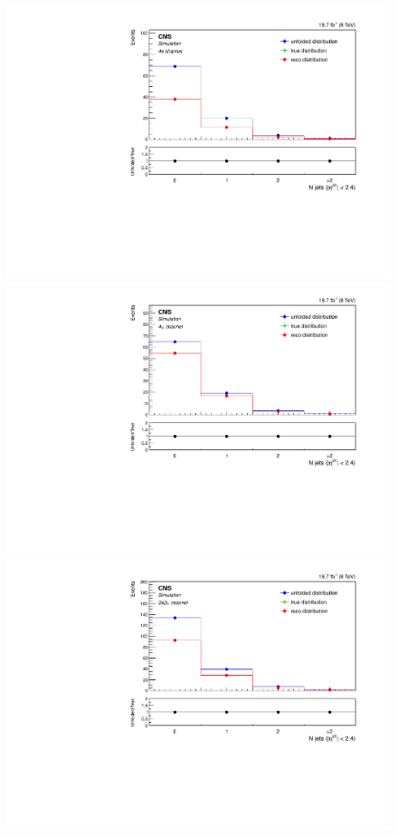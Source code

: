 \begin{figure}[hbtp]
\begin{center}
     \includegraphics[width=0.8\cmsFigWidth]{Figures/Unfolding/MCTests/CentralJets_ZZTo4e_PowMatrix_PowDistr_FullSample_fr}     
    \includegraphics[width=0.8\cmsFigWidth]{Figures/Unfolding/MCTests/CentralJets_ZZTo4m_PowMatrix_PowDistr_FullSample_fr}     
    \includegraphics[width=0.8\cmsFigWidth]{Figures/Unfolding/MCTests/CentralJets_ZZTo2e2m_PowMatrix_PowDistr_FullSample_fr}      

\end{center}
\end{figure}

